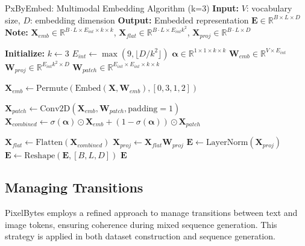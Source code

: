 \documentclass[10pt,a4paper]{article}
\begin{document}
\begin{algorithm}[h]
\caption{PxByEmbed: Multimodal Embedding Algorithm (k=3)
\newline
\textbf{Input:} $V$: vocabulary size, $D$: embedding dimension
\newline
\textbf{Output:} Embedded representation $\mathbf{E} \in \mathbb{R}^{B \times L \times D}$
\newline
\textbf{Note:} $\mathbf{X}_{emb} \in \mathbb{R}^{B \cdot L \times E_{int} \times k \times k}$, 
$\mathbf{X}_{flat} \in \mathbb{R}^{B \cdot L \times E_{int}k^2}$, 
$\mathbf{X}_{proj} \in \mathbb{R}^{B \cdot L \times D}$
}
\begin{algorithmic}[0]
\State \textbf{Initialize:}
\State $k \gets 3$
\State $E_{int} \gets \max(9, \lfloor D / k^2 \rfloor)$
\State $\mathbf{\alpha} \in \mathbb{R}^{1 \times 1 \times k \times k}$ 
\State $\mathbf{W}_{emb} \in \mathbb{R}^{V \times E_{int}}$ 
\State $\mathbf{W}_{proj} \in \mathbb{R}^{E_{int}k^2 \times D}$ 
\State $\mathbf{W}_{patch} \in \mathbb{R}^{E_{int} \times E_{int} \times k \times k}$ 

    \State $\mathbf{X}_{emb} \gets \text{Permute}(\text{Embed}(\mathbf{X}, \mathbf{W}_{emb}), [0, 3, 1, 2])$ 
    
    \State $\mathbf{X}_{patch} \gets \text{Conv2D}(\mathbf{X}_{emb}, \mathbf{W}_{patch}, \text{padding}=1)$
    \State $\mathbf{X}_{combined} \gets \sigma(\mathbf{\alpha}) \odot \mathbf{X}_{emb} + (1 - \sigma(\mathbf{\alpha})) \odot \mathbf{X}_{patch}$
    
    \State $\mathbf{X}_{flat} \gets \text{Flatten}(\mathbf{X}_{combined})$ 
    \State $\mathbf{X}_{proj} \gets \mathbf{X}_{flat}\mathbf{W}_{proj}$ 
    \State $\mathbf{E} \gets \text{LayerNorm}(\mathbf{X}_{proj})$
    \State $\mathbf{E} \gets \text{Reshape}(\mathbf{E}, [B, L, D])$
    \State \Return $\mathbf{E}$
\EndFunction
\end{algorithmic}
\end{algorithm}

\subsection{Managing Transitions}

PixelBytes employs a refined approach to manage transitions between text and image tokens, ensuring coherence during mixed sequence generation. This strategy is applied in both dataset construction and sequence generation.
\end{document}
